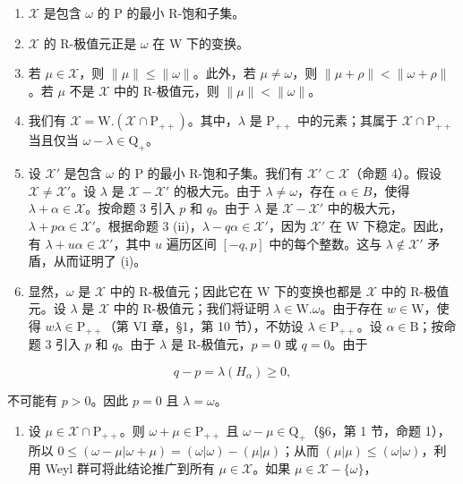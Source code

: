 \begin{enumerate}
\def\labelenumi{(\roman{enumi})}
\item
  \(\mathcal{X}\) 是包含 \(\omega\) 的 P 的最小 R-饱和子集。
\item
  \(\mathcal{X}\) 的 R-极值元正是 \(\omega\) 在 W 下的变换。
\item
  若 \(\mu \in \mathcal{X}\)，则 \(\| \mu \| \leq \| \omega \|\)。此外，若 \(\mu \neq \omega\)，则 \(\| \mu + \rho \| < \| \omega + \rho \|\)。若 \(\mu\) 不是 \(\mathcal{X}\) 中的 R-极值元，则 \(\| \mu \| < \| \omega \|\)。
\item
  我们有 \(\mathcal{X} = \mathrm{W.}(\mathcal{X}\cap \mathrm{P}_{++})\)。其中，\(\lambda\) 是 \(\mathrm{P}_{++}\) 中的元素；其属于 \(\mathcal{X}\cap \mathrm{P}_{++}\) 当且仅当 \(\omega -\lambda \in \mathrm{Q}_{+}\)。
\item
  设 \(\mathcal{X}'\) 是包含 \(\omega\) 的 P 的最小 R-饱和子集。我们有 \(\mathcal{X}' \subset \mathcal{X}\)（命题 4）。假设 \(\mathcal{X} \neq \mathcal{X}'\)。设 \(\lambda\) 是 \(\mathcal{X} - \mathcal{X}'\) 的极大元。由于 \(\lambda \neq \omega\)，存在 \(\alpha \in B\)，使得 \(\lambda + \alpha \in \mathcal{X}\)。按命题 3 引入 \(p\) 和 \(q\)。由于 \(\lambda\) 是 \(\mathcal{X} - \mathcal{X}'\) 中的极大元，\(\lambda + p\alpha \in \mathcal{X}'\)。根据命题 3 (ii)，\(\lambda - q\alpha \in \mathcal{X}'\)，因为 \(\mathcal{X}'\) 在 W 下稳定。因此，有 \(\lambda + u\alpha \in \mathcal{X}'\)，其中 \(u\) 遍历区间 \([-q, p]\) 中的每个整数。这与 \(\lambda \notin \mathcal{X}'\) 矛盾，从而证明了 (i)。
\item
  显然，\(\omega\) 是 \(\mathcal{X}\) 中的 R-极值元；因此它在 W 下的变换也都是 \(\mathcal{X}\) 中的 R-极值元。设 \(\lambda\) 是 \(\mathcal{X}\) 中的 R-极值元；我们将证明 \(\lambda \in \mathrm{W}.\omega\)。由于存在 \(w \in \mathrm{W}\)，使得 \(w\lambda \in \mathrm{P}_{++}\)（第 VI 章，§1，第 10 节），不妨设 \(\lambda \in \mathrm{P}_{++}\)。设 \(\alpha \in \mathrm{B}\)；按命题 3 引入 \(p\) 和 \(q\)。由于 \(\lambda\) 是 R-极值元，\(p = 0\) 或 \(q = 0\)。由于
\end{enumerate}

\[
q - p = \lambda (H _ {\alpha}) \geq 0,
\]

不可能有 \(p > 0\)。因此 \(p = 0\) 且 \(\lambda = \omega\)。

\begin{enumerate}
\def\labelenumi{(\roman{enumi})}
\setcounter{enumi}{2}
\tightlist
\item
  设 \(\mu \in \mathcal{X} \cap \mathrm{P}_{++}\)。则 \(\omega + \mu \in \mathrm{P}_{++}\) 且 \(\omega - \mu \in \mathrm{Q}_+\)（§6，第 1 节，命题 1），所以 \(0 \leq (\omega - \mu|\omega + \mu) = (\omega|\omega) - (\mu|\mu)\)；从而 \((\mu|\mu) \leq (\omega|\omega)\)，利用 Weyl 群可将此结论推广到所有 \(\mu \in \mathcal{X}\)。如果 \(\mu \in \mathcal{X} - \{\omega\}\)，
\end{enumerate}


